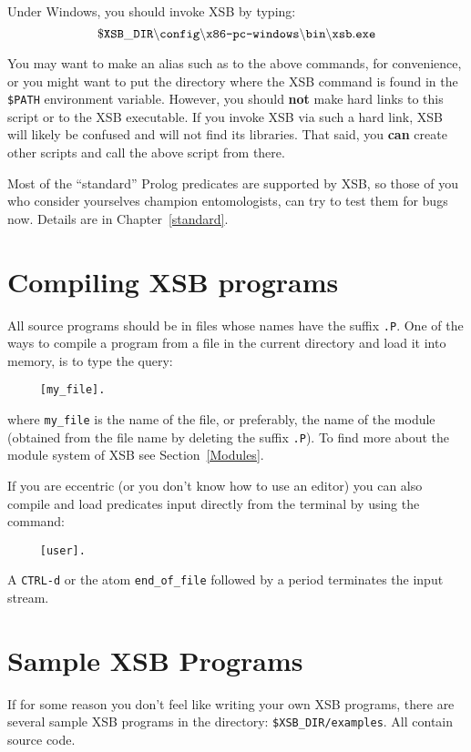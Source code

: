 Under Windows, you should invoke XSB by typing:
\[
 \tt
 \$XSB\_DIR\backslash config\backslash \mbox{\tt x86-pc-windows}\backslash bin
 \backslash xsb.exe
\]


You may want to make an alias such as {\tt \smallourprolog} to the above
commands, for convenience, or you might want to put the directory where the
XSB command is found in the {\tt \$PATH} environment variable. However, you
should {\bf not} make hard links to this script or to the XSB executable.
If you invoke XSB via such a hard link, XSB will likely be confused and will
not find its libraries.  That said, you {\bf can} create other scripts and
call the above script from there.

Most of the ``standard'' Prolog predicates are supported by XSB, 
so those of you who consider yourselves champion entomologists, can try
to test them for bugs now.  Details are in Chapter~\ref{standard}.


\section{Compiling XSB programs}

All source programs should be in files whose names have the 
suffix {\tt .P}.  One of the ways to compile a program from a file in 
the current directory and load it into memory, is to type the query:
\begin{verbatim}
     [my_file].
\end{verbatim}
where \verb'my_file' is the name of the file, or preferably, the name
of the module (obtained from the file name by deleting the suffix {\tt .P}).
To find more about the module system of XSB see Section~\ref{Modules}.

If you are eccentric (or you don't know how to use an editor) you can also 
compile and load predicates input directly from the terminal by using the
command:
\begin{verbatim}
     [user].
\end{verbatim}
A {\tt CTRL-d} or the atom \verb'end_of_file' followed by a period 
terminates the input stream.


\section{Sample XSB Programs}

If for some reason you don't feel like writing your own XSB programs, 
there are several sample XSB programs in the directory: 
{\tt \$XSB\_DIR/examples}.  All contain source code.

